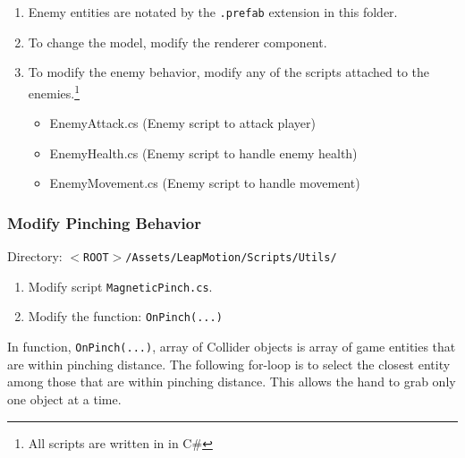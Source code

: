 \documentclass[a4paper]{refart}
\begin{document}
\begin{enumerate}
	\item Enemy entities are notated by the \texttt{.prefab} extension in this folder.
	\item To change the model, modify the renderer component.
	\item To modify the enemy behavior, modify any of the scripts attached to the enemies.\footnote{All scripts are written in in C\#}
	\begin{itemize}
		\item EnemyAttack.cs (Enemy script to attack player)
		\item EnemyHealth.cs (Enemy script to handle enemy health)
		\item EnemyMovement.cs (Enemy script to handle movement)
	\end{itemize}
\end{enumerate}

\subsubsection{Modify Pinching Behavior}

Directory: \texttt{$<$ROOT$>$/Assets/LeapMotion/Scripts/Utils/}

\begin{enumerate}
	\item Modify script \texttt{MagneticPinch.cs}.
	\item Modify the function: \texttt{OnPinch(...)}
\end{enumerate}

In function, \texttt{OnPinch(...)}, array of Collider objects is array of game entities that are within pinching distance. The following for-loop is to select the closest entity among those that are within pinching distance. This allows the hand to grab only one object at a time.
\end{document}
